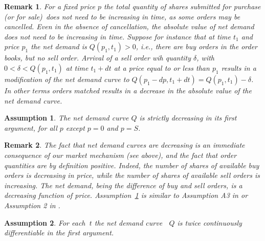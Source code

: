 \documentclass{article}
\newtheorem{remark}{Remark}
\newtheorem{assumption}{Assumption}
\begin{document}
\begin{remark}
For a fixed price $p$ the total quantity of shares submitted for purchase
(or for sale)\ does not need to be increasing in time, as some orders may be
cancelled. Even in the absence of cancellation, the absolute value of net
demand does not need to be increasing in time. Suppose for instance that at
time $t_{1}$ and price $p_{1}$ the net demand is $Q(p_{1},t_{1})>0$, i.e.,
there are buy orders in the order books, but no sell order. Arrival of a
sell order wih quantity $\delta $, with $0<\delta <Q(p_{1},t_{1})$ at time $%
t_{1} + dt$ at a price equal to or less than $p_{1}$ results in a
modification of the net demand curve to $%
Q(p_{1}-dp,t_{1}+dt)=Q(p_{1},t_{1})-\delta $. In other terms orders matched
results in a decrease in the absolute value of the net demand curve.
\end{remark}



\begin{assumption}
\label{ass::decrease_net_demand} The net demand curve $Q$ is strictly
decreasing in its first argument, for all $p$ except $p=0$ and $p=S$.
\end{assumption}



\begin{remark}
The fact that net demand curves are decreasing is an immediate consequence
of our market mechanism (see above), and the fact that order quantities are
by definition positive. Indeed, the number of shares of available buy orders
is decreasing in price, while the number of shares of available sell orders
is increasing. The net demand, being the difference of buy and sell orders,
is a decreasing function of price. Assumption~\ref{ass::decrease_net_demand}
is similar to Assumption A3 in \cite{Jar92} or Assumption 2 in \cite{BB04}.
\end{remark}



\begin{assumption}
\label{ass::demand_twice_diff} For each\textbf{\ }$t$ the net demand curve%
\textbf{\ }$Q$ is twice continuously differentiable in the first argument.
\end{assumption}

\end{document}
